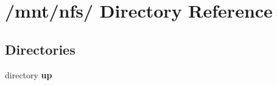\section{/mnt/nfs/ Directory Reference}
\label{dir_89b9a6018dd9d56eed0453a00ae90b1e}
\subsection*{Directories}
\begin{CompactItemize}
\item 
directory \bf{up}
\end{CompactItemize}
